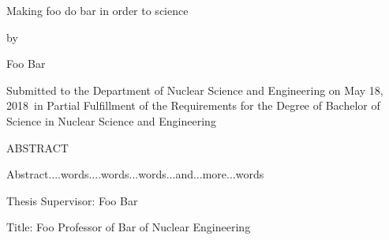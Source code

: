 \documentclass{article}
\newcommand{\thesis}{Making foo do bar in order to science}
\newcommand{\me}{Foo Bar}
\newcommand{\signDate}{May 18, 2018}
\newcommand{\advisorName}{Foo Bar}
\newcommand{\advisorTitle}{Foo Professor of Bar of Nuclear Engineering}
\newcommand{\abstractart}{   
    Abstract....words....words...words...and...more...words
    }
\begin{document}
\newpage
\begin{titlepage}
    \begin{center}
    {\large{\thesis}}
    
    \bigskip
    {by}
    
    \bigskip
    {\me}
    
    \bigskip
    {\parbox{3.7in}{\centering Submitted to the Department of Nuclear Science and Engineering on {\signDate}\ in Partial Fulfillment of the Requirements for the Degree of Bachelor of Science in Nuclear Science and Engineering}}
    \end{center}
    \bigskip
    
    \begin{flushleft}
    ABSTRACT
    
    \bigskip
    \abstractart
    \vfill
    {Thesis Supervisor: \advisorName}
    
    {Title: \advisorTitle}
    \end{flushleft}
    
\end{titlepage}
\end{document}
